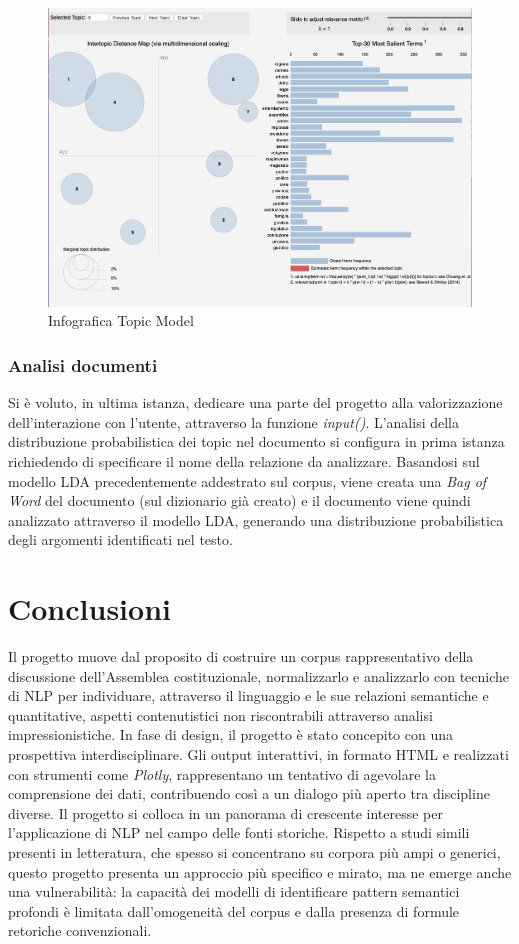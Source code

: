 \documentclass[11pt,twocolumn]{article}
\begin{document}
\begin{figure}
    \centering
    \includegraphics[width=0.9\linewidth]{topic_model.png}
    \caption{Infografica Topic Model}
    \label{fig:enter-label}
\end{figure}

\subsubsection{Analisi documenti}

Si è voluto, in ultima istanza, dedicare una parte del progetto alla valorizzazione dell'interazione con l'utente, attraverso la funzione \textit{input()}. L'analisi della distribuzione probabilistica dei topic nel documento si configura in prima istanza richiedendo di specificare il nome della relazione da analizzare.
Basandosi sul modello LDA precedentemente addestrato sul corpus, viene creata una \textit{Bag of Word} del documento (sul dizionario già creato) e il documento viene quindi analizzato attraverso il modello LDA, generando una distribuzione probabilistica degli argomenti identificati nel testo.

\section{Conclusioni}
Il progetto muove dal proposito di costruire un corpus rappresentativo della discussione dell'Assemblea costituzionale, normalizzarlo e analizzarlo con tecniche di NLP per individuare, attraverso il linguaggio e le sue relazioni semantiche e quantitative, aspetti contenutistici non riscontrabili attraverso analisi impressionistiche. In fase di design, il progetto è stato concepito con una prospettiva interdisciplinare. Gli output interattivi, in formato HTML e realizzati con strumenti come \textit{Plotly}, rappresentano un tentativo di agevolare la comprensione dei dati, contribuendo così a un dialogo più aperto tra discipline diverse. Il progetto si colloca in un panorama di crescente interesse per l'applicazione di NLP nel campo delle fonti storiche. Rispetto a studi simili presenti in letteratura, che spesso si concentrano su corpora più ampi o generici, questo progetto presenta un approccio più specifico e mirato, ma ne emerge anche una vulnerabilità: la capacità dei modelli di identificare pattern semantici profondi è limitata dall'omogeneità del corpus e dalla presenza di formule retoriche convenzionali. 
\end{document}
